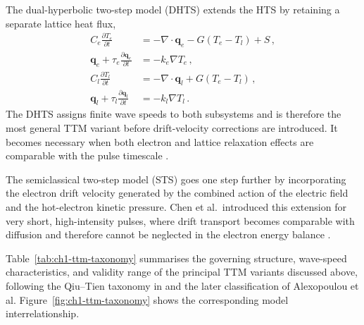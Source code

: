   The dual-hyperbolic two-step model (DHTS) extends the HTS by retaining a separate lattice heat flux,
  \begin{align*}
    C_e \frac{\partial T_e}{\partial t}                            & = -\nabla \cdot \mathbf{q}_e - G(T_e - T_l) + S \, , \\
    \mathbf{q}_e + \tau_e \frac{\partial \mathbf{q}_e}{\partial t} & = -k_e \nabla T_e \, ,                               \\
    C_l \frac{\partial T_l}{\partial t}                            & = -\nabla \cdot \mathbf{q}_l + G(T_e - T_l) \, ,     \\
    \mathbf{q}_l + \tau_l \frac{\partial \mathbf{q}_l}{\partial t} & = -k_l \nabla T_l \, .
  \end{align*}
  The DHTS assigns finite wave speeds to both subsystems and is therefore the most general TTM variant before drift-velocity corrections are introduced. It becomes necessary when both electron and lattice relaxation effects are comparable with the pulse timescale \cite{Chen_2001}.

  The semiclassical two-step model (STS) goes one step further by incorporating the electron drift velocity generated by the combined action of the electric field and the hot-electron kinetic pressure. Chen et al.\ introduced this extension for very short, high-intensity pulses, where drift transport becomes comparable with diffusion and therefore cannot be neglected in the electron energy balance \cite{Chen_2006}.

  Table~\ref{tab:ch1-ttm-taxonomy} summarises the governing structure, wave-speed characteristics, and validity range of the principal TTM variants discussed above, following the Qiu--Tien taxonomy in \cite{Qiu_1992} and the later classification of Alexopoulou et al. Figure~\ref{fig:ch1-ttm-taxonomy} shows the corresponding model interrelationship.


